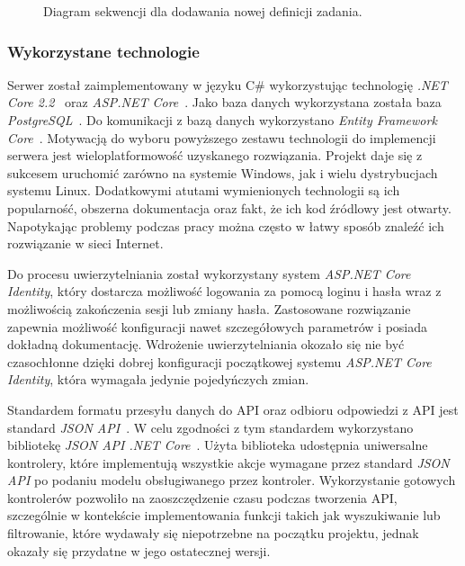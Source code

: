 \documentclass[a4paper,11pt,twoside]{report}
\theoremstyle{definition}
\begin{document}
\begin{figure} 
    \caption{Diagram sekwencji dla dodawania nowej definicji zadania.}
    \label{task-definition-sequence-diagram}
\end{figure}

\subsubsection{Wykorzystane technologie}
Serwer został zaimplementowany w języku C\# wykorzystując technologię \textit{.NET Core 2.2}~\cite{dotnet-core} oraz \textit{ASP.NET Core}~\cite{aspnet-core}. Jako baza danych wykorzystana została baza \textit{PostgreSQL}~\cite{postgresql}. Do komunikacji z bazą danych wykorzystano \textit{Entity Framework Core}~\cite{ef-core}. 
Motywacją do wyboru powyższego zestawu technologii do implemencji serwera jest wieloplatformowość uzyskanego rozwiązania. 
Projekt daje się z sukcesem uruchomić zarówno na systemie Windows, jak i wielu dystrybucjach systemu Linux. 
Dodatkowymi atutami wymienionych technologii są ich popularność, obszerna dokumentacja oraz fakt, że ich kod źródlowy jest otwarty. Napotykając problemy podczas pracy można często w łatwy sposób znaleźć ich rozwiązanie w sieci Internet.

Do procesu uwierzytelniania został wykorzystany system \textit{ASP.NET Core Identity}, który dostarcza możliwość logowania za pomocą loginu i hasła wraz z możliwością zakończenia sesji lub zmiany hasła. Zastosowane rozwiązanie zapewnia możliwość konfiguracji nawet szczegółowych parametrów i posiada dokładną dokumentację. 
Wdrożenie uwierzytelniania okozało się nie być czasochłonne dzięki dobrej konfiguracji początkowej systemu \textit{ASP.NET Core Identity}, która wymagała jedynie pojedyńczych zmian.

Standardem formatu przesyłu danych do API oraz odbioru odpowiedzi z API jest standard \textit{JSON API}~\cite{jsonapi}. W celu zgodności z tym standardem wykorzystano bibliotekę \textit{JSON API .NET Core}~\cite{jsonapi-dotnet-core}. Użyta biblioteka udostępnia uniwersalne kontrolery, które implementują wszystkie akcje wymagane przez standard \textit{JSON API} po podaniu modelu obsługiwanego przez kontroler. Wykorzystanie gotowych kontrolerów pozwoliło na zaoszczędzenie czasu podczas tworzenia API, szczególnie w kontekście implementowania funkcji takich jak wyszukiwanie lub filtrowanie, które wydawały się niepotrzebne na początku projektu, jednak okazały się przydatne w jego ostatecznej wersji.
\end{document}
